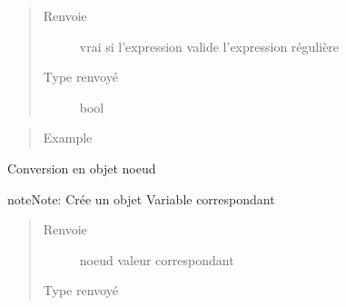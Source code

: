 \documentclass[letterpaper,10pt,french]{sphinxmanual}
\begin{document}
\begin{fulllineitems}
\begin{fulllineitems}
\begin{quote}
\begin{description}
\item[{Renvoie}] \leavevmode
vrai si l’expression valide l’expression régulière

\item[{Type renvoyé}] \leavevmode
bool

\end{description}\end{quote}
\begin{quote}\begin{description}
\item[{Example}] \leavevmode
\begin{sphinxVerbatim}[commandchars=\\\{\}]
\end{sphinxVerbatim}

\end{description}\end{quote}

\end{fulllineitems}


\begin{fulllineitems}
\label{\detokenize{parsertokens:parsertokens.TokenVariable.toNode}}
Conversion en objet noeud

\begin{sphinxadmonition}{note}{Note:}
Crée un objet Variable correspondant
\end{sphinxadmonition}
\begin{quote}\begin{description}
\item[{Renvoie}] \leavevmode
noeud valeur correspondant

\item[{Type renvoyé}] \leavevmode
{\hyperref[\detokenize{arithmeticexpressionnodes:arithmeticexpressionnodes.ValueNode}]{}}


\end{description}
\end{quote}
\end{fulllineitems}
\end{fulllineitems}
\end{document}

